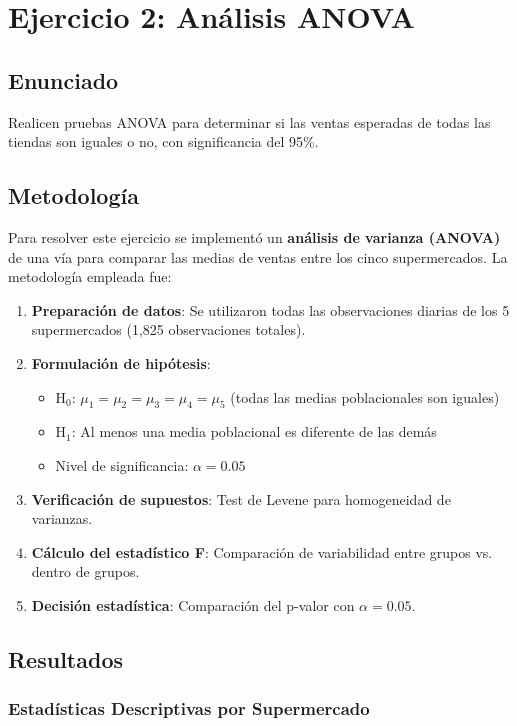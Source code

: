 \documentclass[11pt,a4paper]{article}
\begin{document}
\section{Ejercicio 2: Análisis ANOVA}

\subsection{Enunciado}
Realicen pruebas ANOVA para determinar si las ventas esperadas de todas las tiendas son iguales o no, con significancia del 95\%.

\subsection{Metodología}

Para resolver este ejercicio se implementó un \textbf{análisis de varianza (ANOVA)} de una vía para comparar las medias de ventas entre los cinco supermercados. La metodología empleada fue:

\begin{enumerate}
    \item \textbf{Preparación de datos}: Se utilizaron todas las observaciones diarias de los 5 supermercados (1,825 observaciones totales).
    \item \textbf{Formulación de hipótesis}:
    \begin{itemize}
        \item H$_0$: $\mu_1 = \mu_2 = \mu_3 = \mu_4 = \mu_5$ (todas las medias poblacionales son iguales)
        \item H$_1$: Al menos una media poblacional es diferente de las demás
        \item Nivel de significancia: $\alpha = 0.05$
    \end{itemize}
    \item \textbf{Verificación de supuestos}: Test de Levene para homogeneidad de varianzas.
    \item \textbf{Cálculo del estadístico F}: Comparación de variabilidad entre grupos vs. dentro de grupos.
    \item \textbf{Decisión estadística}: Comparación del p-valor con $\alpha = 0.05$.
\end{enumerate}

\subsection{Resultados}

\subsubsection{Estadísticas Descriptivas por Supermercado}
\end{document}
